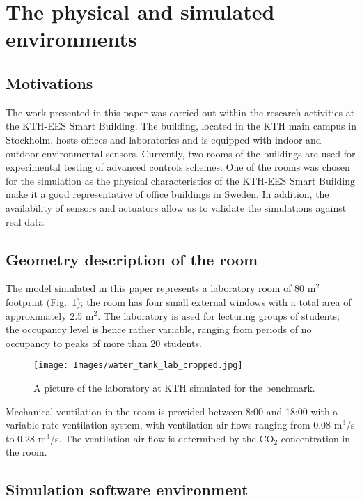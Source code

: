 \documentclass{article}
\begin{document}
\section{The physical and simulated environments}
\subsection{Motivations}
The work presented in this paper was carried out within the research activities
at the KTH-EES Smart Building. The building, located in the KTH main campus in
Stockholm, hosts offices and laboratories and is equipped with indoor and
outdoor environmental sensors. Currently, two rooms of the buildings are used
for experimental testing of advanced controls schemes. One of the rooms was
chosen for the simulation as the physical characteristics of the KTH-EES Smart
Building make it a good representative of office buildings in Sweden. In
addition, the availability of sensors and actuators allow us to validate the
simulations against real data.



\subsection{Geometry description of the room}

The model simulated in this paper represents a laboratory room of 80 m$^2$
footprint (Fig.~\ref{fig:testebd_pic}); the room has four small external
windows with a total area of approximately 2.5 m$^2$. The laboratory is used
for lecturing groups of students; the occupancy level is hence rather variable,
ranging from periods of no occupancy to peaks of more than 20 students.

\begin{figure}[htb]
\centering
\texttt{[image: Images/water\_tank\_lab\_cropped.jpg]}
\caption{A picture of the laboratory at KTH simulated for the benchmark.}
\label{fig:testebd_pic}
\end{figure}

Mechanical ventilation in the room is provided between 8:00 and 18:00 with a variable rate ventilation system, with
ventilation air flows ranging from 0.08 m$^3$/s to 0.28 m$^3$/s.
The ventilation air flow is determined by the CO$_2$ concentration in the room.

\subsection{Simulation software environment}
\end{document}
